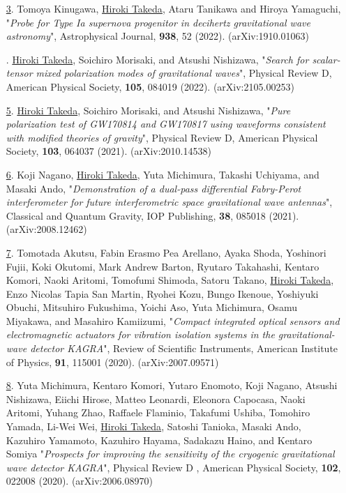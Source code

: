 \documentclass[uplatex, 12pt]{article}
\newcommand{\ctext}[1]{\ooalign{
\hfil\resizebox{\width}{\height}{#1}\hfil
\crcr
\raise.2mm\hbox{\large$\bigcirc$}}}
\begin{document}
\begin{enumerate}
\item[\uline{3}.] Tomoya Kinugawa, \uline{Hiroki Takeda}, Ataru Tanikawa and Hiroya Yamaguchi, "\emph{Probe for Type Ia supernova progenitor in decihertz gravitational wave astronomy}", Astrophysical Journal, {\bf 938}, 52 (2022). (arXiv:1910.01063)\\

\item[\uline{\ctext{4}}.] \uline{Hiroki Takeda}, Soichiro Morisaki, and Atsushi Nishizawa,
"\emph{Search for scalar-tensor mixed polarization modes of gravitational waves}",
Physical Review D, American Physical Society, {\bf 105}, 084019 (2022).
(arXiv:2105.00253)\\

   \item[\uline{5}.] \uline{Hiroki Takeda}, Soichiro Morisaki, and Atsushi Nishizawa, "\emph{Pure polarization test of GW170814 and GW170817 using waveforms consistent with modified theories of gravity}", Physical Review D, American Physical Society, {\bf 103}, 064037 (2021). (arXiv:2010.14538)\\
   
\item[\uline{6}.] Koji Nagano, \uline{Hiroki Takeda}, Yuta Michimura, Takashi Uchiyama, and Masaki Ando, "\emph{Demonstration of a dual-pass differential Fabry-Perot interferometer for future interferometric space gravitational wave antennas}", Classical and Quantum Gravity, IOP Publishing, {\bf 38}, 085018 (2021). (arXiv:2008.12462)\\
  
\item[\uline{7}.] Tomotada Akutsu, Fabin Erasmo Pea Arellano, Ayaka Shoda, Yoshinori Fujii, Koki Okutomi, Mark Andrew Barton, Ryutaro Takahashi, Kentaro Komori, Naoki Aritomi, Tomofumi Shimoda, Satoru Takano, \uline{Hiroki Takeda}, Enzo Nicolas Tapia San Martin, Ryohei Kozu, Bungo Ikenoue, Yoshiyuki Obuchi, Mitsuhiro Fukushima, Yoichi Aso, Yuta Michimura, Osamu Miyakawa, and Masahiro Kamiizumi, "\emph{Compact integrated optical sensors and electromagnetic actuators for vibration isolation systems in the gravitational-wave detector KAGRA}", Review of Scientific Instruments, American Institute of Physics, {\bf 91}, 115001 (2020). (arXiv:2007.09571)\\

\item[\uline{8}.] Yuta Michimura, Kentaro Komori, Yutaro Enomoto, Koji Nagano, Atsushi Nishizawa, Eiichi Hirose, Matteo Leonardi, Eleonora Capocasa, Naoki Aritomi, Yuhang Zhao, Raffaele Flaminio, Takafumi Ushiba, Tomohiro Yamada, Li-Wei Wei, \uline{Hiroki Takeda}, Satoshi Tanioka, Masaki Ando, Kazuhiro Yamamoto, Kazuhiro Hayama, Sadakazu Haino, and Kentaro Somiya "\emph{Prospects for improving the sensitivity of the cryogenic gravitational wave detector KAGRA}", Physical Review D , American Physical Society, {\bf 102}, 022008 (2020). (arXiv:2006.08970)\\


\end{enumerate}
\end{document}
